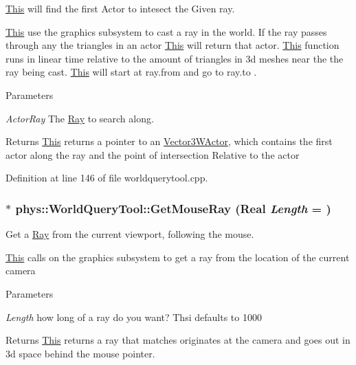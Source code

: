 \hyperlink{structThis}{This} will find the first Actor to intesect the Given ray. 

\hyperlink{structThis}{This} use the graphics subsystem to cast a ray in the world. If the ray passes through any the triangles in an actor \hyperlink{structThis}{This} will return that actor. \hyperlink{structThis}{This} function runs in linear time relative to the amount of triangles in 3d meshes near the the ray being cast. \hyperlink{structThis}{This} will start at ray.from and go to ray.to . 
\begin{DoxyParams}{Parameters}
\item[{\em ActorRay}]The \hyperlink{classphys_1_1Ray}{Ray} to search along. \end{DoxyParams}
\begin{DoxyReturn}{Returns}
\hyperlink{structThis}{This} returns a pointer to an \hyperlink{classphys_1_1Vector3WActor}{Vector3WActor}, which contains the first actor along the ray and the point of intersection Relative to the actor 
\end{DoxyReturn}


Definition at line 146 of file worldquerytool.cpp.

\hypertarget{classphys_1_1WorldQueryTool_a567b20eb6ba6f17961f5cd892bd5a0ed}{
\subsubsection[{GetMouseRay}]{ $\ast$ phys::WorldQueryTool::GetMouseRay ({\bf Real} {\em Length} = {})}}
\label{d8/d69/classphys_1_1WorldQueryTool_a567b20eb6ba6f17961f5cd892bd5a0ed}


Get a \hyperlink{classphys_1_1Ray}{Ray} from the current viewport, following the mouse. 

\hyperlink{structThis}{This} calls on the graphics subsystem to get a ray from the location of the current camera 
\begin{DoxyParams}{Parameters}
\item[{\em Length}]how long of a ray do you want? Thsi defaults to 1000 \end{DoxyParams}
\begin{DoxyReturn}{Returns}
\hyperlink{structThis}{This} returns a ray that matches originates at the camera and goes out in 3d space behind the mouse pointer. 
\end{DoxyReturn}



